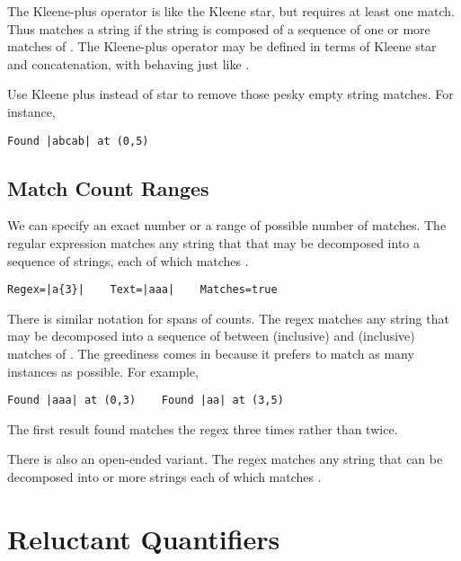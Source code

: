 The Kleene-plus operator is like the Kleene star, but requires at
least one match.  Thus \code{+} matches a string if the
string is composed of a sequence of one or more matches of
.  The Kleene-plus operator may be defined in terms
of Kleene star and concatenation, with  behaving
just like .  

Use Kleene plus instead
of star to remove those pesky empty string matches.  For instance, 
%
\begin{verbatim}
Found |abcab| at (0,5)
\end{verbatim}

\subsection{Match Count Ranges}

We can specify an exact number or a range of possible number of
matches.  The regular expression 
matches any string that that may be decomposed into a sequence of
 strings, each of which matches .
%
\begin{verbatim}
Regex=|a{3}|    Text=|aaa|    Matches=true
\end{verbatim}
%

There is similar notation for spans of counts.  The regex
 matches any string that
may be decomposed into a sequence of between  (inclusive)
and  (inclusive) matches of .  The greediness
comes in because it prefers to match as many instances as possible.
For example,
%
\begin{verbatim}
Found |aaa| at (0,3)    Found |aa| at (3,5)
\end{verbatim}
%
The first result found matches the regex  three times
rather than twice.  

There is also an open-ended variant.  The regex
 matches any string that can be
decomposed into  or more strings each of which matches
.

\section{Reluctant Quantifiers}

